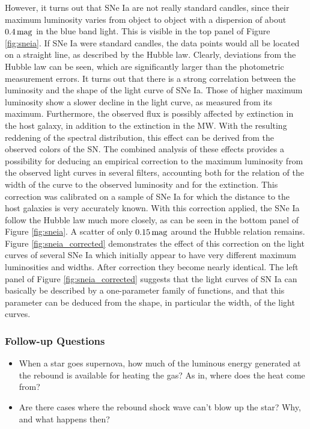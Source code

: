 \documentclass[a4paper,10pt]{article}
\begin{document}
{\noindent}However, it turns out that SNe Ia are not really standard candles, since their maximum luminosity varies from object to object with a dispersion of about $0.4\,{\rm mag}$ in the blue band light. This is visible in the top panel of Figure \ref{fig:sneia}. If SNe Ia were standard candles, the data points would all be located on a straight line, as described by the Hubble law. Clearly, deviations from the Hubble law can be seen, which are significantly larger than the photometric measurement errors. It turns out that there is a strong correlation between the luminosity and the shape of the light curve of SNe Ia. Those of higher maximum luminosity show a slower decline in the light curve, as measured from its maximum. Furthermore, the observed flux is possibly affected by extinction in the host galaxy, in addition to the extinction in the MW. With the resulting reddening of the spectral distribution, this effect can be derived from the observed colors of the SN. The combined analysis of these effects provides a possibility for deducing an empirical correction to the maximum luminosity from the observed light curves in several filters, accounting both for the relation of the width of the curve to the observed luminosity and for the extinction. This correction was calibrated on a sample of SNe Ia for which the distance to the host galaxies is very accurately known. With this correction applied, the SNe Ia follow the Hubble law much more closely, as can be seen in the bottom panel of Figure \ref{fig:sneia}. A scatter of only $0.15\,{\rm mag}$ around the Hubble relation remains. Figure \ref{fig:sneia_corrected} demonstrates the effect of this correction on the light curves of several SNe Ia which initially appear to have very different maximum luminosities and widths. After correction they become nearly identical. The left panel of Figure \ref{fig:sneia_corrected} suggests that the light curves of SN Ia can basically be described by a one-parameter family of functions, and that this parameter can be deduced from the shape, in particular the width, of the light curves.

\subsubsection{Follow-up Questions}

\begin{itemize}
    \item When a star goes supernova, how much of the luminous energy generated at the rebound is available for heating the gas? As in, where does the heat come from?
    \item Are there cases where the rebound shock wave can't blow up the star? Why, and what happens then?
\end{itemize}
\end{document}
